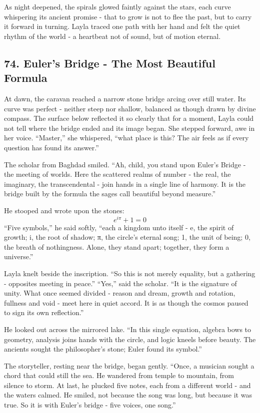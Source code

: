 \documentclass[
  letterpaper,
  DIV=11,
  numbers=noendperiod]{scrreprt}
\begin{document}
As night deepened, the spirals glowed faintly against the stars, each
curve whispering its ancient promise - that to grow is not to flee the
past, but to carry it forward in turning. Layla traced one path with her
hand and felt the quiet rhythm of the world - a heartbeat not of sound,
but of motion eternal.

\subsection{74. Euler's Bridge - The Most Beautiful
Formula}\label{eulers-bridge---the-most-beautiful-formula}

At dawn, the caravan reached a narrow stone bridge arcing over still
water. Its curve was perfect - neither steep nor shallow, balanced as
though drawn by divine compass. The surface below reflected it so
clearly that for a moment, Layla could not tell where the bridge ended
and its image began. She stepped forward, awe in her voice. ``Master,''
she whispered, ``what place is this? The air feels as if every question
has found its answer.''

The scholar from Baghdad smiled. ``Ah, child, you stand upon Euler's
Bridge - the meeting of worlds. Here the scattered realms of number -
the real, the imaginary, the transcendental - join hands in a single
line of harmony. It is the bridge built by the formula the sages call
beautiful beyond measure.''

He stooped and wrote upon the stones: \[
e^{i\pi} + 1 = 0
\] ``Five symbols,'' he said softly, ``each a kingdom unto itself - e,
the spirit of growth; i, the root of shadow; π, the circle's eternal
song; 1, the unit of being; 0, the breath of nothingness. Alone, they
stand apart; together, they form a universe.''

Layla knelt beside the inscription. ``So this is not merely equality,
but a gathering - opposites meeting in peace.'' ``Yes,'' said the
scholar. ``It is the signature of unity. What once seemed divided -
reason and dream, growth and rotation, fullness and void - meet here in
quiet accord. It is as though the cosmos paused to sign its own
reflection.''

He looked out across the mirrored lake. ``In this single equation,
algebra bows to geometry, analysis joins hands with the circle, and
logic kneels before beauty. The ancients sought the philosopher's stone;
Euler found its symbol.''

The storyteller, resting near the bridge, began gently. ``Once, a
musician sought a chord that could still the sea. He wandered from
temple to mountain, from silence to storm. At last, he plucked five
notes, each from a different world - and the waters calmed. He smiled,
not because the song was long, but because it was true. So it is with
Euler's bridge - five voices, one song.''
\end{document}
